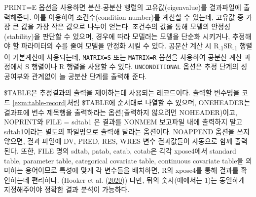 \documentclass[
  10pt,
  krantz2,
  a4paper]{krantz}
\newenvironment{Shaded}{\begin{snugshade}}{\end{snugshade}}
\newcommand{\NormalTok}[1]{#1}
\newcommand{\OperatorTok}[1]{\textcolor[rgb]{0.81,0.36,0.00}{\textbf{#1}}}
\theoremstyle{definition}
\theoremstyle{definition}
\theoremstyle{definition}
\theoremstyle{remark}
\begin{document}
\begin{Shaded}
\end{Shaded}

PRINT=E 옵션을 사용하면 분산-공분산 행렬의 고유값(eigenvalue)를 결과파일에 출력해준다. 이를 이용하여 조건수(condition number)를 계산할 수 있는데, 고유값 중 가장 큰 값을 가장 작은 값으로 나누어 얻는다. 조건수의 값을 통해 모델의 안정성(stability)을 판단할 수 있으며, 경우에 따라 모델러는 모델을 단순화 시키거나, 추정해야 할 파라미터의 수를 줄여 모델을 안정화 시킬 수 있다. 공분산 계산 시 R\textsubscript{-1}SR\textsubscript{-1} 행렬이 기본계산에 사용되는데, \texttt{MATRIX=S} 또는 \texttt{MATRIX=R} 옵션을 사용하여 공분산 계산 과정에서 S 행렬이나 R 행렬을 사용할 수 있다. \texttt{UNCONDITIONAL} 옵션은 추정 단계의 성공여부와 관계없이 늘 공분산 단계를 출력해 준다.

\$TABLE은 추정결과의 출력을 제어하는데 사용되는 레코드이다. 출력할 변수명을 코드 \ref{exm:table-record}처럼 \$TABLE에 순서대로 나열할 수 있으며, ONEHEADER는 결과표에 변수 제목행을 출력하라는 옵션(출력하지 않으려면 NOHEADER)이고, NOPRINT와 FILE = sdtab1 은 결과를 NONMEM 보고파일 내에 출력하지 말고 sdtab1이라는 별도의 파일명으로 출력해 달라는 옵션이다. NOAPPEND 옵션을 쓰지 않으면, 결과 파일에 DV, PRED, RES, WRES 변수 결과값들이 자동으로 함께 출력된다. 또한, FILE 명의 sdtab, patab, catab, cotab은 각각 xpose4에서 standard table, parameter table, categorical covariate table, continuous covariate table을 의미하는 용어이므로 특성에 맞게 각 변수들을 배치하면, R의 xpose4를 통해 결과를 확인하는데 편리하다. (Hooker et al. (\protect\hyperlink{ref-R-xpose4}{2020})) 다만, 뒤의 숫자(예에서는 1)는 동일하게 지정해주어야 정확한 결과 분석이 가능하다.
\end{document}

